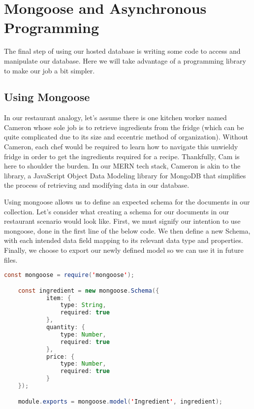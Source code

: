 \section{Mongoose and Asynchronous Programming}

The final step of using our hosted database is writing some code to access and manipulate our database. Here we will take advantage of a programming library to make our job a bit simpler. 

\subsection*{Using Mongoose}

In our restaurant analogy, let's assume there is one kitchen worker named Cameron whose sole job is to retrieve ingredients from the fridge (which can be quite complicated due to its size and eccentric method of organization). Without Cameron, each chef would be required to learn how to navigate this unwieldy fridge in order to get the ingredients required for a recipe. Thankfully, Cam is here to shoulder the burden. In our MERN tech stack, Cameron is akin to the  library, a JavaScript Object Data Modeling library for MongoDB that simplifies the process of retrieving and modifying data in our database. 

Using mongoose allows us to define an expected schema for the documents in our collection. Let's consider what creating a schema for our documents in our restaurant scenario would look like. First, we must signify our intention to use mongoose, done in the first line of the below code. We then define a new Schema, with each intended data field mapping to its relevant data type and properties. Finally, we choose to export our newly defined model so we can use it in future files.

\vspace{.5cm}

\begin{lstlisting}[language=Java]
    const mongoose = require('mongoose');

    const ingredient = new mongoose.Schema({
            item: {
                type: String,
                required: true
            },
            quantity: {
                type: Number,
                required: true
            },
            price: {
                type: Number,
                required: true
            }
    });

    module.exports = mongoose.model('Ingredient', ingredient);
\end{lstlisting}


